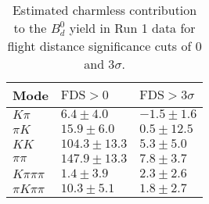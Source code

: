 \begin{table}[h]
  \centering
  \begin{tabular}{lll}
      \toprule
      Mode & $\mathrm{FDS} > 0$ & $\mathrm{FDS} > 3\sigma$ \\
      \midrule
      $K\pi$ & $6.4 \pm 4.0$ & $-1.5 \pm 1.6$ \\
      $\pi K$ & $15.9 \pm 6.0$ & $0.5 \pm 12.5$ \\
      $KK$ & $104.3 \pm 13.3$ & $5.3 \pm 5.0$ \\
      $\pi\pi$ & $147.9 \pm 13.3$ & $7.8 \pm 3.7$ \\
      $K\pi\pi\pi$ & $1.4 \pm 3.9$ & $2.3 \pm 2.6$ \\
      $\pi K\pi\pi$ & $10.3 \pm 5.1$ & $1.8 \pm 2.7$ \\
      \bottomrule
  \end{tabular}
  \caption{\small Estimated charmless contribution to the $B^{0}_{d}$ yield in Run 1 data for flight distance significance cuts of 0  and $3\sigma$.}
\label{tab:charmless_yields_Bd_run_1}
\end{table}
